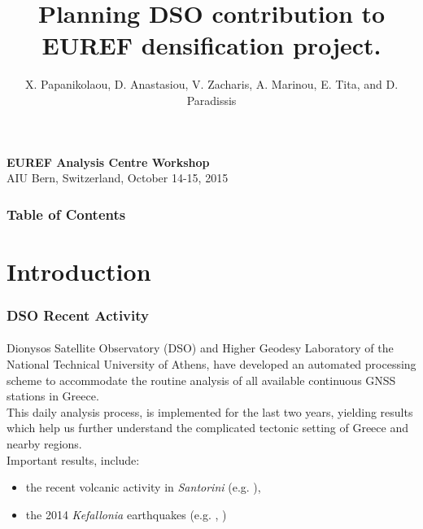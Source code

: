 \documentclass{beamer}
\title{Planning DSO contribution to EUREF densification project.}
\date{}
\author{X. Papanikolaou, D. Anastasiou, V. Zacharis, A. Marinou, E. Tita, and D. Paradissis}
\institute{National Technical University of Athens\\Dionysos Satellite Observatory\\\url{http://dionysos.survey.ntua.gr}}
\begin{document}
\begin{frame}[plain]
\maketitle
\begin{block}{}
    \begin{center}
      \textbf{EUREF Analysis Centre Workshop}\\
    AIU Bern, Switzerland, October 14-15, 2015 \\
    \end{center}
\end{block}
\end{frame}

\begin{frame}
    \frametitle{Table of Contents}
    \tableofcontents
\end{frame}

\section{Introduction}

\begin{frame}\frametitle{DSO Recent Activity}\framesubtitle{}

  Dionysos Satellite Observatory (DSO) and Higher Geodesy Laboratory of the 
  National Technical University of Athens, have developed an automated processing
  scheme to accommodate the routine analysis of all available continuous GNSS 
  stations in Greece.
  \\
  This daily analysis process, is implemented for the last two years, yielding 
  results which help us further understand the complicated tectonic setting of 
  Greece and nearby regions.
  \\
  Important results, include:
  \begin{itemize}
    \item the recent volcanic activity in \emph{Santorini} (e.g. \cite{papoutsis}),
    \item the 2014 \emph{Kefallonia} earthquakes (e.g. \cite{sarkefalonia}, \cite{sakkas})
  \end{itemize}
\end{frame}
\end{document}
